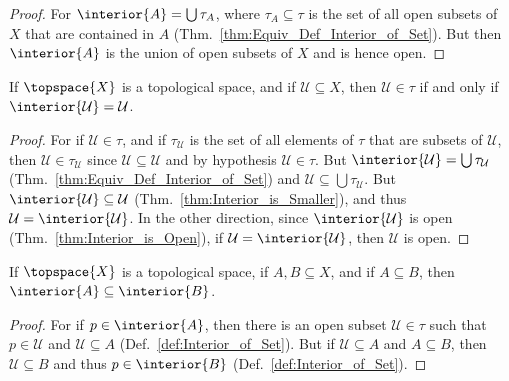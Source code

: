 \documentclass{article}                                                        %
\begin{document}
        \begin{proof}
            For $\interior{A}=\bigcup\tau_{A}$, where $\tau_{A}\subseteq\tau$
            is the set of all open subsets of $X$ that are contained in $A$
            (Thm.~\ref{thm:Equiv_Def_Interior_of_Set}). But then $\interior{A}$
            is the union of open subsets of $X$ and is hence open.
        \end{proof}
        \begin{theorem}
            \label{thm:Open_iff_Int_A_eq_A}%
            If $\topspace{X}$ is a topological space, and if
            $\mathcal{U}\subseteq{X}$, then $\mathcal{U}\in\tau$ if and only if
            $\interior{\mathcal{U}}=\mathcal{U}$.
        \end{theorem}
        \begin{proof}
            For if $\mathcal{U}\in\tau$, and if $\tau_{\mathcal{U}}$ is the set
            of all elements of $\tau$ that are subsets of $\mathcal{U}$, then
            $\mathcal{U}\in\tau_{\mathcal{U}}$ since
            $\mathcal{U}\subseteq\mathcal{U}$ and by hypothesis
            $\mathcal{U}\in\tau$. But
            $\interior{\mathcal{U}}=\bigcup\tau_{\mathcal{U}}$
            (Thm.~\ref{thm:Equiv_Def_Interior_of_Set}) and
            $\mathcal{U}\subseteq\bigcup\tau_{\mathcal{U}}$. But
            $\interior{\mathcal{U}}\subseteq\mathcal{U}$
            (Thm.~\ref{thm:Interior_is_Smaller}), and thus
            $\mathcal{U}=\interior{\mathcal{U}}$. In the other direction, since
            $\interior{\mathcal{U}}$ is open (Thm.~\ref{thm:Interior_is_Open}),
            if $\mathcal{U}=\interior{\mathcal{U}}$, then $\mathcal{U}$ is open.
        \end{proof}
        \begin{theorem}
            \label{thm:Interior_Preserves_Inclusion}%
            If $\topspace{X}$ is a topological space, if $A,B\subseteq{X}$, and
            if $A\subseteq{B}$, then $\interior{A}\subseteq\interior{B}$.
        \end{theorem}
        \begin{proof}
            For if $p\in\interior{A}$, then there is an open subset
            $\mathcal{U}\in\tau$ such that $p\in\mathcal{U}$ and
            $\mathcal{U}\subseteq{A}$ (Def.~\ref{def:Interior_of_Set}). But if
            $\mathcal{U}\subseteq{A}$ and $A\subseteq{B}$, then
            $\mathcal{U}\subseteq{B}$ and thus $p\in\interior{B}$
            (Def.~\ref{def:Interior_of_Set}).
        \end{proof}
\end{document}

